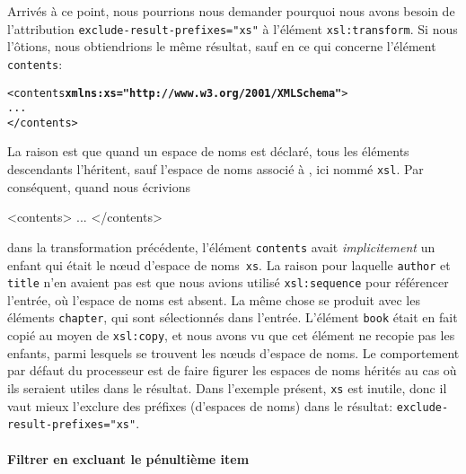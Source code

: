 Arrivés à ce point, nous pourrions nous demander pourquoi nous avons
besoin de l'attribution
\texttt{exclude-result-prefixes="xs"} à l'élément
\texttt{xsl:transform}. Si nous l'ôtions, nous obtiendrions le même
résultat, sauf en ce qui concerne l'élément \texttt{contents}:
\begin{alltt}
\small   <contents \textbf{xmlns:xs="http://www.w3.org/2001/XMLSchema"}>
     ...
   </contents>
\end{alltt}
La raison est que quand un espace de noms est déclaré, tous les
éléments descendants l'héritent, sauf l'espace de noms associé à
\XSLT, ici nommé \texttt{xsl}. Par conséquent, quand nous écrivions
\begin{sverb}
   <contents>
     ...
   </contents>
\end{sverb}
dans la transformation précédente, l'élément \texttt{contents} avait
\emph{implicitement} un enfant qui était le nœud d'espace de
noms~\texttt{xs}. La raison pour laquelle \texttt{author} et
\texttt{title} n'en avaient pas est que nous avions utilisé
\texttt{xsl:sequence} pour référencer l'entrée, où l'espace de noms
est absent. La même chose se produit avec les éléments
\texttt{chapter}, qui sont sélectionnés dans l'entrée. L'élément
\texttt{book} était en fait copié au moyen de \texttt{xsl:copy}, et
nous avons vu que cet élément ne recopie pas les enfants, parmi
lesquels se trouvent les nœuds d'espace de noms. Le comportement
par défaut du processeur \XSLT est de faire figurer les espaces de
noms hérités au cas où ils seraient utiles dans le résultat. Dans
l'exemple présent, \texttt{xs} est inutile, donc il vaut mieux
l'exclure des préfixes (d'espaces de noms) dans le résultat:
\texttt{exclude-result-prefixes="xs"}.

\paragraph{Filtrer en excluant le pénultième item}

